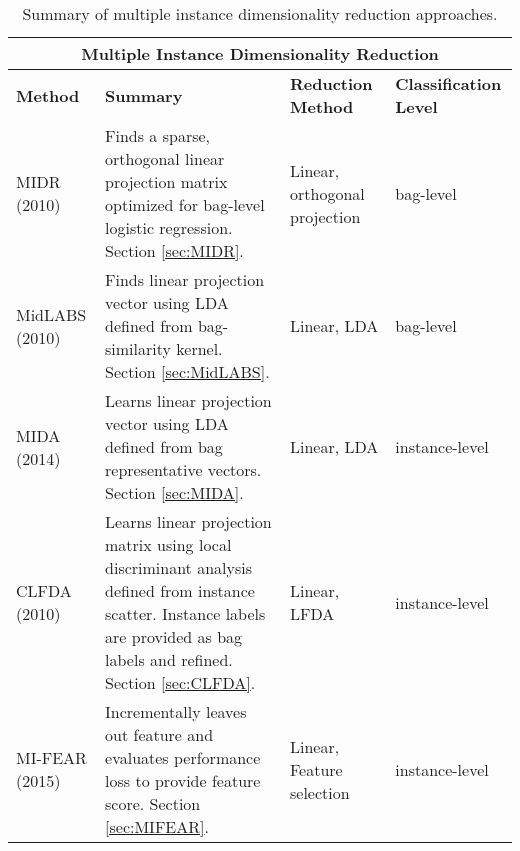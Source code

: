 \begin{longtable}{ |p{2cm}|p{6cm}|p{2cm}|p{3cm}|  } 
	\caption{Summary of multiple instance dimensionality reduction approaches.}
	\label{tab:MIDRComparison}\\
	\hline
	\multicolumn{4}{|c|}{\textbf{Multiple Instance Dimensionality Reduction}} \\
	\hline
	\textbf{Method} & \textbf{Summary} & \textbf{Reduction Method} & \textbf{Classification Level}\\
	\hline
	MIDR  \newline (2010)  & Finds a sparse, orthogonal linear projection matrix optimized for bag-level logistic regression.  Section \ref{sec:MIDR}.   &Linear, orthogonal projection  &  bag-level\\
	\hline
	MidLABS \newline (2010) &  Finds linear projection vector using LDA defined from bag-similarity kernel. Section \ref{sec:MidLABS}.  & Linear, LDA   & bag-level\\
	\hline
	MIDA \newline (2014) &Learns linear projection vector using LDA defined from bag representative vectors. Section \ref{sec:MIDA}. & Linear, LDA &  instance-level\\
	\hline
	CLFDA \newline (2010)  &Learns linear projection matrix using local discriminant analysis defined from instance scatter.  Instance labels are provided as bag labels and refined. Section \ref{sec:CLFDA}. & Linear, LFDA &  instance-level\\
	\hline
	MI-FEAR \newline (2015) &  Incrementally leaves out feature and evaluates performance loss to provide feature score.  Section \ref{sec:MIFEAR}.  & Linear, Feature selection & instance-level\\
	\hline
\end{longtable}

